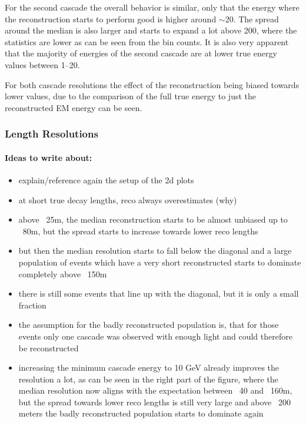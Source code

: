 For the second cascade the overall behavior is similar, only that the energy where the reconstruction starts to perform good is higher around $\sim$\SI{20}{\gev}. The spread around the median is also larger and starts to expand a lot above \SI{200}{\gev}, where the statistics are lower as can be seen from the bin counts. It is also very apparent that the majority of energies of the second cascade are at lower true energy values between \SIrange[range-phrase=~and~]{1}{20}{\gev}.

For both cascade resolutions the effect of the reconstruction being biased towards lower values, due to the comparison of the full true energy to just the reconstructed EM energy can be seen.


\subsubsection{Length Resolutions}


\paragraph{Ideas to write about:}
\begin{itemize}
    \item explain/reference again the setup of the 2d plots
    \item at short true decay lengths, reco always overestimates (why)
    \item above ~25m, the median reconstruction starts to be almost unbiased up to ~80m, but the spread starts to increase towards lower reco lengths
    \item but then the median resolution starts to fall below the diagonal and a large population of events which have a very short reconstructed starts to dominate completely above ~150m
    \item there is still some events that line up with the diagonal, but it is only a small fraction
    \item the assumption for the badly reconstructed population is, that for those events only one cascade was observed with enough light and could therefore be reconstructed
    \item increasing the minimum cascade energy to 10 GeV already improves the resolution a lot, as can be seen in the right part of the figure, where the median resolution now aligns with the expectation between ~40 and ~160m, but the spread towards lower reco lengths is still very large and above ~200 meters the badly reconstructed population starts to dominate again
\end{itemize}

